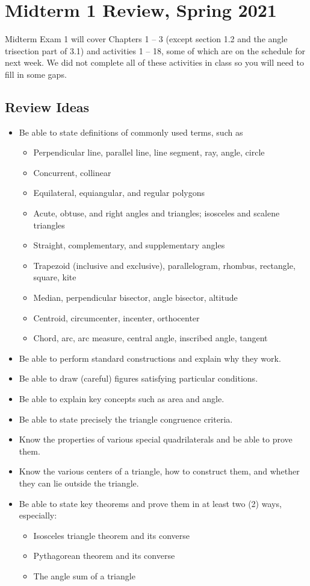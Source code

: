 \newpage

\section{Midterm 1 Review, Spring 2021}
Midterm Exam 1 will cover Chapters 1 -- 3 (except section 1.2 and the angle trisection part of 3.1) and activities 1 -- 18, some of which are on the schedule for next week.  We did not complete all of these activities in class so you will need to fill in some gaps.  
\subsection{Review Ideas}

\begin{itemize}\itemsep0em
\item Be able to state definitions of commonly used terms, such as 
\begin{itemize}
\item Perpendicular line, parallel line, line segment, ray, angle, circle
\item Concurrent, collinear
\item Equilateral, equiangular, and regular polygons
\item Acute, obtuse, and right angles and triangles; isosceles and scalene triangles
\item Straight, complementary, and supplementary angles
\item Trapezoid (inclusive and exclusive), parallelogram, rhombus, rectangle, square, kite
\item Median, perpendicular bisector, angle bisector, altitude
\item Centroid, circumcenter, incenter, orthocenter
\item Chord, arc, arc measure, central angle, inscribed angle, tangent
\end{itemize}
\item Be able to perform standard constructions and explain why they work. 
\item Be able to draw (careful) figures satisfying particular conditions.  
\item Be able to explain key concepts such as area and angle.   
\item Be able to state precisely the triangle congruence criteria. 
\item Know the properties of various special quadrilaterals and be able to prove them.  
\item Know the various centers of a triangle, how to construct them, and whether they can lie outside the triangle.  
\item Be able to state key theorems and prove them in at least two (2) ways, especially:  
\begin{itemize}
\item Isosceles triangle theorem and its converse
\item Pythagorean theorem and its converse
\item The angle sum of a triangle 
\end{itemize}
\end{itemize}

